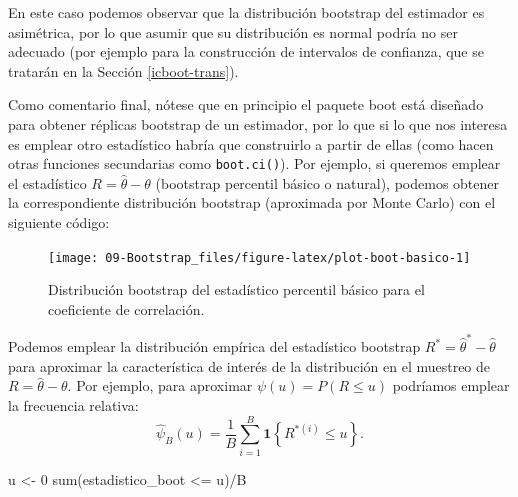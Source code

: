 \documentclass[
  10pt,
]{book}
\newenvironment{Shaded}{\begin{snugshade}}{\end{snugshade}}
\newcommand{\DecValTok}[1]{\textcolor[rgb]{0.00,0.00,0.81}{#1}}
\newcommand{\FunctionTok}[1]{\textcolor[rgb]{0.00,0.00,0.00}{#1}}
\newcommand{\NormalTok}[1]{#1}
\newcommand{\OtherTok}[1]{\textcolor[rgb]{0.56,0.35,0.01}{#1}}
\newcommand{\SpecialCharTok}[1]{\textcolor[rgb]{0.00,0.00,0.00}{#1}}
\renewcommand{\mathbf}[1]{\symbf{#1}}
\theoremstyle{break}
\theoremstyle{nonumberplain}
\begin{document}
En este caso podemos observar que la distribución bootstrap del estimador es asimétrica, por lo que asumir que su distribución es normal podría no ser adecuado (por ejemplo para la construcción de intervalos de confianza, que se tratarán en la Sección \ref{icboot-trans}).

Como comentario final, nótese que en principio el paquete boot está diseñado para obtener réplicas bootstrap de un estimador, por lo que si lo que nos interesa es emplear otro estadístico habría que construirlo a partir de ellas (como hacen otras funciones secundarias como \texttt{boot.ci()}).
Por ejemplo, si queremos emplear el estadístico \(R = \hat \theta - \theta\)
(bootstrap percentil básico o natural), podemos obtener la correspondiente distribución bootstrap (aproximada por Monte Carlo) con el siguiente código:

\begin{Shaded}
\end{Shaded}

\begin{figure}[!htbp]

{\centering \texttt{[image: 09-Bootstrap\_files/figure-latex/plot-boot-basico-1]} 

}

\caption{Distribución bootstrap del estadístico percentil básico para el coeficiente de correlación.}\label{fig:plot-boot-basico}
\end{figure}

Podemos emplear la distribución empírica del estadístico bootstrap \(R^{\ast} = \hat \theta^{\ast} - \hat \theta\) para aproximar la característica de interés de la distribución en el muestreo de \(R = \hat \theta - \theta\).
Por ejemplo, para aproximar \(\psi(u) = P\left( R \leq u \right)\) podríamos emplear la frecuencia relativa:
\[\hat{\psi}_{B}(u) =
\frac{1}{B}\sum_{i=1}^{B}\mathbf{1}\left\{ R^{\ast (i)}\leq u\right\}.\]

\begin{Shaded}
\begin{Highlighting}[]
\NormalTok{u }\OtherTok{\textless{}{-}} \DecValTok{0}
\FunctionTok{sum}\NormalTok{(estadistico\_boot }\SpecialCharTok{\textless{}=}\NormalTok{ u)}\SpecialCharTok{/}\NormalTok{B}
\end{Highlighting}
\end{Shaded}
\end{document}
